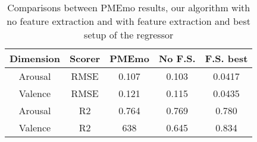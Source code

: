 \begin{table}[h!]
	\centering
	\begin{tabular}{|c|c|c||c||c|}
		\hline
		Dimension & Scorer & PMEmo & No F.S. & F.S. best \\ [0.5ex] 
		\hline\hline Arousal & RMSE & 0.107 & 0.103 & 0.0417 \\ 
		\hline Valence & RMSE & 0.121 & 0.115 & 0.0435 \\
		\hline Arousal & R2 & 0.764 & 0.769 & 0.780 \\
		\hline Valence & R2 & 638 & 0.645 & 0.834 \\
		\hline
	\end{tabular}
	\caption{Comparisons between PMEmo results, our algorithm with no feature extraction and with feature extraction and best setup of the regressor}
	\label{table:comparisons}
\end{table}

